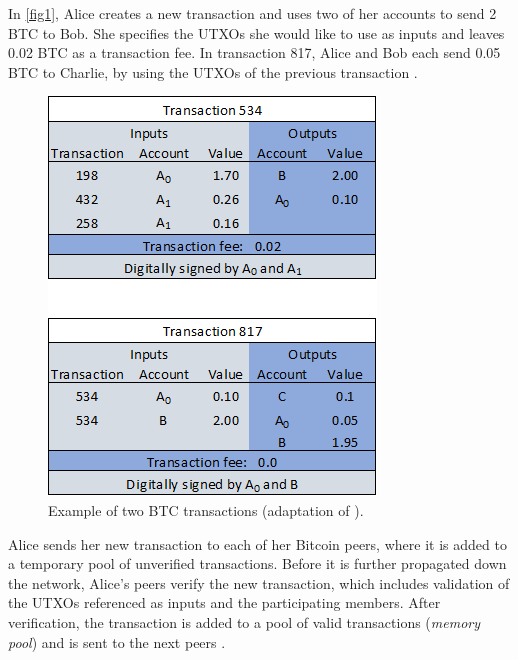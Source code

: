\documentclass[a4paper,12pt,twoside]{report}
\begin{document}
In \autoref{fig1}, Alice creates a new transaction and uses two of her accounts to send 2 BTC to Bob. She specifies the UTXOs she would like to use as inputs and leaves 0.02 BTC as a transaction fee. In transaction 817, Alice and Bob each send 0.05 BTC to Charlie, by using the UTXOs of the previous transaction \cite{DSAwithTime}.
\begin{figure}[ht]
	\centering
  \includegraphics[scale=0.7]{TransactionExample.png}
	\caption{Example of two BTC transactions (adaptation of \cite{DSAwithTime}).}
	\label{fig1}
\end{figure}

Alice sends her new transaction to each of her Bitcoin peers, where it is added to a temporary pool of unverified transactions. Before it is further propagated down the network, Alice's peers verify the new transaction, which includes validation of the UTXOs referenced as inputs and the participating members. After verification, the transaction is added to a pool of valid transactions (\textit{memory pool}) and is sent to the next peers \cite{antonopoulos2017mastering}.
\end{document}

